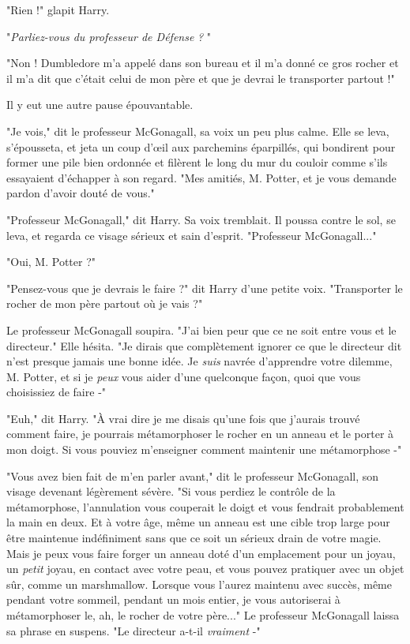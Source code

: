 "Rien !" glapit Harry.

"\emph{Parliez-vous du professeur de Défense}  \emph{?} "

"Non ! Dumbledore m'a appelé dans son bureau et il m'a donné ce gros rocher et il m'a dit que c'était celui de mon père et que je devrai le transporter partout !"

Il y eut une autre pause épouvantable.

"Je vois," dit le professeur McGonagall, sa voix un peu plus calme. Elle se leva, s'épousseta, et jeta un coup d'œil aux parchemins éparpillés, qui bondirent pour former une pile bien ordonnée et filèrent le long du mur du couloir comme s'ils essayaient d'échapper à son regard. "Mes amitiés, M. Potter, et je vous demande pardon d'avoir douté de vous."

"Professeur McGonagall," dit Harry. Sa voix tremblait. Il poussa contre le sol, se leva, et regarda ce visage sérieux et sain d'esprit. "Professeur McGonagall..."

"Oui, M. Potter ?"

"Pensez-vous que je devrais le faire ?" dit Harry d'une petite voix. "Transporter le rocher de mon père partout où je vais ?"

Le professeur McGonagall soupira. "J'ai bien peur que ce ne soit entre vous et le directeur." Elle hésita. "Je dirais que complètement ignorer ce que le directeur dit n'est presque jamais une bonne idée. Je \emph{suis}  navrée d'apprendre votre dilemme, M. Potter, et si je \emph{peux } vous aider d'une quelconque façon, quoi que vous choisissiez de faire -"

"Euh," dit Harry. "À vrai dire je me disais qu'une fois que j'aurais trouvé comment faire, je pourrais métamorphoser le rocher en un anneau et le porter à mon doigt. Si vous pouviez m'enseigner comment maintenir une métamorphose -"

"Vous avez bien fait de m'en parler avant," dit le professeur McGonagall, son visage devenant légèrement sévère. "Si vous perdiez le contrôle de la métamorphose, l'annulation vous couperait le doigt et vous fendrait probablement la main en deux. Et à votre âge, même un anneau est une cible trop large pour être maintenue indéfiniment sans que ce soit un sérieux drain de votre magie. Mais je peux vous faire forger un anneau doté d'un emplacement pour un joyau, un \emph{petit}  joyau, en contact avec votre peau, et vous pouvez pratiquer avec un objet sûr, comme un marshmallow. Lorsque vous l'aurez maintenu avec succès, même pendant votre sommeil, pendant un mois entier, je vous autoriserai à métamorphoser le, ah, le rocher de votre père..." Le professeur McGonagall laissa sa phrase en suspens. "Le directeur a-t-il \emph{vraiment}  -"

